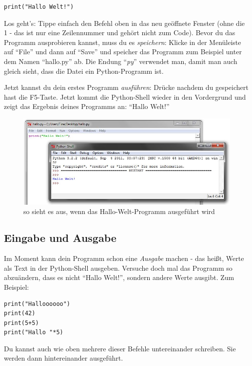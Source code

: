 	\begin{lstlisting}
print("Hallo Welt!")
	\end{lstlisting}
	
	Los geht's: Tippe einfach den Befehl oben in das neu geöffnete Fenster (ohne die 1 - das ist nur eine Zeilennummer und gehört nicht zum Code). 
	Bevor du das Programm ausprobieren kannst, muss du es \emph{speichern}: Klicke in der Menüleiste auf \enquote{File} und dann auf \enquote{Save} und speicher das Programm zum Beispiel unter dem Namen \enquote{hallo.py} ab. Die Endung \enquote{\emph{py}} verwendet man, damit man auch gleich sieht, dass die Datei ein Python-Programm ist.
	
	Jetzt kannst du dein erstes Programm \emph{ausführen}: Drücke nachdem du gespeichert hast die F5-Taste. Jetzt kommt die Python-Shell wieder in den Vordergrund und zeigt das Ergebnis deines Programms an: \enquote{Hallo Welt!}
	
	\begin{figure}[htbp]
		\centering
		\includegraphics[width=1\textwidth]{img/HalloWelt.jpg}
		\caption{so sieht es aus, wenn das Hallo-Welt-Programm ausgeführt wird}
		\label{HalloWelt}
	\end{figure}
	
	\subsection*{Eingabe und Ausgabe}
	Im Moment kann dein Programm schon eine \emph{Ausgabe} machen - das heißt, Werte als Text in der Python-Shell ausgeben. Versuche doch mal das Programm so abzuändern, dass es nicht \enquote{Hallo Welt!}, sondern andere Werte ausgibt. Zum Beispiel:
	
	\begin{lstlisting}
print("Halloooooo")
print(42)
print(5+5)
print("Hallo "*5)
	\end{lstlisting}
	
	Du kannst auch wie oben mehrere dieser Befehle untereinander schreiben. Sie werden dann hintereinander ausgeführt.
	
